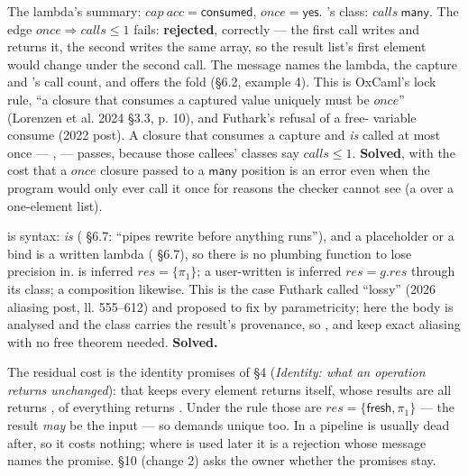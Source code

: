 The lambda's summary: $\mathit{cap}\ \mathit{acc}=\mathsf{consumed}$, $\mathit{once}=\mathsf{yes}$. 's class: $\mathit{calls}\ \mathsf{many}$. The edge $\mathit{once}\Longrightarrow \mathit{calls}\le 1$ fails: \textbf{rejected}, correctly — the first call writes  and returns it, the second writes the same array, so the result list's first element would change under the second call. The message names the lambda, the capture and 's call count, and offers the fold (§6.2, example 4). This is OxCaml's lock rule, “a closure that consumes a captured value uniquely must be $\mathit{once}$” (Lorenzen et al. 2024 §3.3, p. 10), and Futhark's refusal of a free- variable consume (2022 post). A closure that consumes a capture and \emph{is} called at most once — ,  — passes, because those callees' classes say $\mathit{calls}\le 1$. \textbf{Solved}, with the cost that a $\mathit{once}$ closure passed to a $\mathsf{many}$ position is an error even when the program would only ever call it once for reasons the checker cannot see (a  over a one-element list).


 is syntax:  \emph{is}  ( §6.7: “pipes rewrite before anything runs”), and a \code{\_\allowbreak{}} placeholder or a \code{<-} bind is a written lambda ( §6.7), so there is no plumbing function to lose precision in.  is inferred $\mathit{res}=\{\pi _{1}\}$; a user-written  is inferred $\mathit{res}=g.\mathit{res}$ through its class; a composition  likewise. This is the case Futhark called “lossy” (2026 aliasing post, ll. 555–612) and proposed to fix by parametricity; here the body is analysed and the class carries the result's provenance, so ,  and \code{|>} keep exact aliasing with no free theorem needed. \textbf{Solved.}

The residual cost is the identity promises of  §4 (\emph{Identity: what an operation returns unchanged}):  that keeps every element returns  itself,  whose results are all \code{===} returns ,  of everything returns . Under the rule those are $\mathit{res}=\{\mathsf{fresh},\allowbreak{}\pi _{1}\}$ — the result \emph{may} be the input — so  demands  unique too. In a pipeline  is usually dead after, so it costs nothing; where  is used later it is a rejection whose message names the promise. §10 (change 2) asks the owner whether the promises stay.


